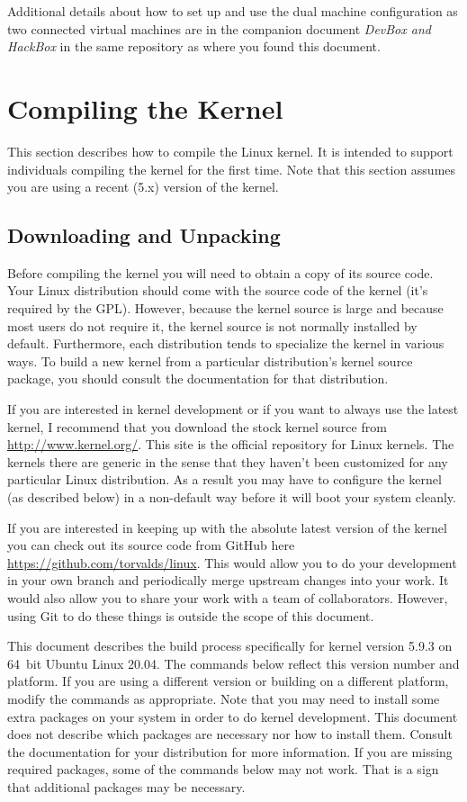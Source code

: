 \documentclass{article}
\begin{document}
Additional details about how to set up and use the dual machine configuration as two connected
virtual machines are in the companion document \textit{DevBox and HackBox} in the same
repository as where you found this document.

\section{Compiling the Kernel}

This section describes how to compile the Linux kernel. It is intended to support individuals
compiling the kernel for the first time. Note that this section assumes you are using a recent
(5.x) version of the kernel.

\subsection{Downloading and Unpacking}

Before compiling the kernel you will need to obtain a copy of its source code. Your Linux
distribution should come with the source code of the kernel (it's required by the GPL). However,
because the kernel source is large and because most users do not require it, the kernel source
is not normally installed by default. Furthermore, each distribution tends to specialize the
kernel in various ways. To build a new kernel from a particular distribution's kernel source
package, you should consult the documentation for that distribution.

If you are interested in kernel development or if you want to always use the latest kernel, I
recommend that you download the stock kernel source from \url{http://www.kernel.org/}. This site
is the official repository for Linux kernels. The kernels there are generic in the sense that
they haven't been customized for any particular Linux distribution. As a result you may have to
configure the kernel (as described below) in a non-default way before it will boot your system
cleanly.

If you are interested in keeping up with the absolute latest version of the kernel you can check
out its source code from GitHub here \url{https://github.com/torvalds/linux}. This would allow
you to do your development in your own branch and periodically merge upstream changes into your
work. It would also allow you to share your work with a team of collaborators. However, using
Git to do these things is outside the scope of this document.

This document describes the build process specifically for kernel version 5.9.3 on 64~bit Ubuntu
Linux 20.04. The commands below reflect this version number and platform. If you are using a
different version or building on a different platform, modify the commands as appropriate. Note
that you may need to install some extra packages on your system in order to do kernel
development. This document does not describe which packages are necessary nor how to install
them. Consult the documentation for your distribution for more information. If you are missing
required packages, some of the commands below may not work. That is a sign that additional
packages may be necessary.
\end{document}
